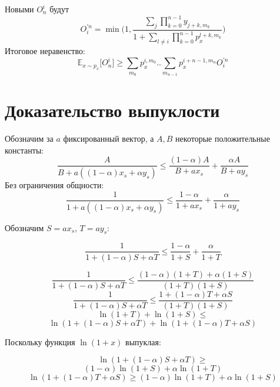 \documentclass[14pt, a4paper]{extarticle}
\begin{document}
Новыми $O_n^i$ будут $$O_i^{'n}=\min \big(1, \frac{\sum_j \prod_{k=0}^{n-1} y_{j + k, m_k}}{1 + \sum_{l \ne i} \prod_{k=0}^{n-1} p_x^{l+k,m_k}} \big)$$
Итоговое неравенство:
$$\mathbb{E}_{x\sim p_x} \big[O_n^i \big]  \geq \sum_{m_0} p_x^{i,m_0} .. \sum_{m_{n-1}} p_x^{i+n-1,m_n} O_i^{'n}
\label{bleu_i_4}$$

\section{Доказательство выпуклости}
\label{app:convex}
Обозначим за $a$ фиксированный вектор, а $A, B$ некоторые положительные константы:
\begin{equation}
\frac{A}{B + a((1 - \alpha)x_s + \alpha y_s)}
\le \frac{(1 - \alpha)A}{B + a x_s} + \frac{\alpha A}{B + a y_s}
\end{equation}
Без ограничения общности:
\begin{equation}
\frac{1}{1 + a((1 - \alpha)x_s + \alpha y_s)}
\le \frac{1 - \alpha}{1 + a x_s} + \frac{\alpha}{1 + a y_s}
\end{equation}

Обозначим $S = a x_s$, $T = a y_s$:

$$
\frac{1}{1 + (1 - \alpha)S + \alpha T} \le \frac{1 - \alpha}{1 + S} + \frac{\alpha}{1 + T}
$$

$$
\frac{1}{1 + (1 - \alpha)S + \alpha T} \le
\frac{(1 - \alpha)(1 + T) + \alpha (1 + S)}{(1 + T)(1 + S)}
$$
$$
\frac{1}{1 +  (1 - \alpha)S + \alpha T} \le
\frac{1 + (1 - \alpha)T + \alpha S}{(1 + T)(1 + S)}
$$
$$
\ln(1 + T) + \ln(1 + S) \le
$$
$$
\ln(1 + (1 - \alpha)S + \alpha T) + \ln(1 + (1 - \alpha)T + \alpha S)
$$

Поскольку функция $\ln(1 + x)$ выпуклая:

$$
\ln(1 + (1 - \alpha)S + \alpha T) \ge$$
$$
(1 - \alpha)\ln(1 + S) + \alpha \ln(1 + T)
$$
$$
\ln(1 + (1 - \alpha)T + \alpha S) \ge (1 - \alpha)\ln(1 + T) + \alpha \ln(1 + S)
$$
\end{document}
